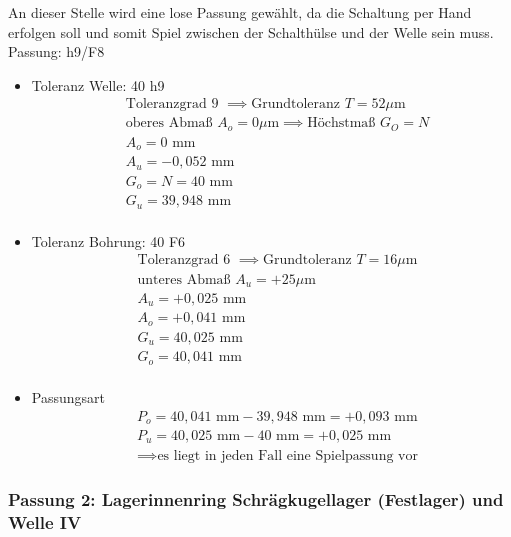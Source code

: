 An dieser Stelle wird eine lose Passung gewählt, da die Schaltung per Hand erfolgen soll und somit Spiel zwischen der Schalthülse und der Welle sein muss. \\ 
Passung: h9/F8
\begin{itemize}
\item Toleranz Welle: 40 h9
\begin{align*}
	&\text{Toleranzgrad 9 } \implies \text{Grundtoleranz } T=52 \mu\text{m} \\
	&\text{oberes Abmaß } A_o = 0 \mu\text{m} \implies \text{Höchstmaß } G_O = N \\
	&A_o = 0 \text{ mm} \\
	&A_u = -0,052 \text{ mm} \\
	&G_o = N = 40 \text{ mm} \\
	&G_u = 39,948 \text{ mm}\\
\end{align*} 
\item Toleranz Bohrung: 40 F6
\begin{align*}
	&\text{Toleranzgrad 6 } \implies \text{Grundtoleranz } T=16 \mu\text{m} \\
	&\text{unteres Abmaß } A_u = +25 \mu\text{m} \\
	&A_u = +0,025 \text{ mm} \\
	&A_o = +0,041 \text{ mm} \\
	&G_u = 40,025 \text{ mm} \\
	&G_o = 40,041 \text{ mm}\\
\end{align*} 
\item Passungsart
\begin{align*}
	&P_o = 40,041 \text{ mm} - 39,948 \text{ mm} = +0,093 \text{ mm} \\
	&P_u = 40,025 \text{ mm} - 40 \text{ mm} = +0,025 \text{ mm}\\
	&\implies \text{es liegt in jeden Fall eine Spielpassung vor}
\end{align*} 
\end{itemize}
\newpage

\subsubsection{Passung 2: Lagerinnenring Schrägkugellager (Festlager) und Welle IV}


